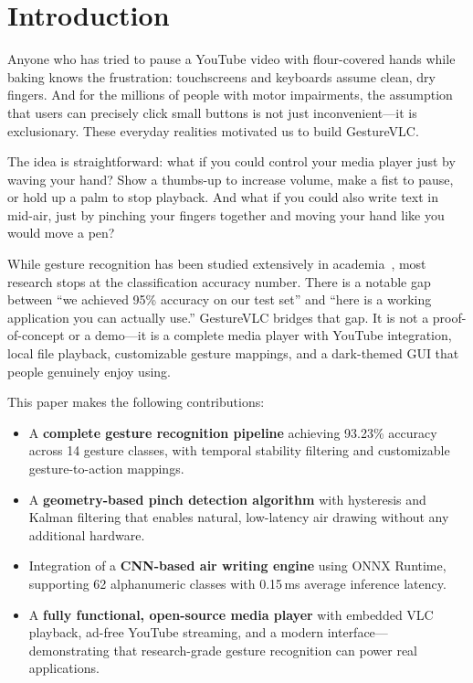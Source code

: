 \documentclass[conference]{IEEEtran}
\begin{document}
\section{Introduction}

Anyone who has tried to pause a YouTube video with flour-covered hands while baking knows the frustration: touchscreens and keyboards assume clean, dry fingers. And for the millions of people with motor impairments, the assumption that users can precisely click small buttons is not just inconvenient---it is exclusionary. These everyday realities motivated us to build GestureVLC.

The idea is straightforward: what if you could control your media player just by waving your hand? Show a thumbs-up to increase volume, make a fist to pause, or hold up a palm to stop playback. And what if you could also write text in mid-air, just by pinching your fingers together and moving your hand like you would move a pen?

While gesture recognition has been studied extensively in academia~\cite{hagrid2022,mediapipe2019}, most research stops at the classification accuracy number. There is a notable gap between ``we achieved 95\% accuracy on our test set'' and ``here is a working application you can actually use.'' GestureVLC bridges that gap. It is not a proof-of-concept or a demo---it is a complete media player with YouTube integration, local file playback, customizable gesture mappings, and a dark-themed GUI that people genuinely enjoy using.

This paper makes the following contributions:

\begin{itemize}[leftmargin=*]
    \item A \textbf{complete gesture recognition pipeline} achieving 93.23\% accuracy across 14 gesture classes, with temporal stability filtering and customizable gesture-to-action mappings.
    \item A \textbf{geometry-based pinch detection algorithm} with hysteresis and Kalman filtering that enables natural, low-latency air drawing without any additional hardware.
    \item Integration of a \textbf{CNN-based air writing engine} using ONNX Runtime, supporting 62 alphanumeric classes with 0.15\,ms average inference latency.
    \item A \textbf{fully functional, open-source media player} with embedded VLC playback, ad-free YouTube streaming, and a modern interface---demonstrating that research-grade gesture recognition can power real applications.
\end{itemize}
\end{document}
